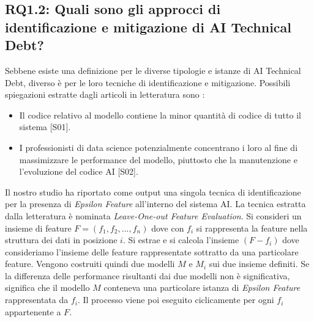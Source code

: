 \subsection{RQ1.2: Quali sono gli approcci di identificazione e mitigazione di AI Technical Debt?}

Sebbene esiste una definizione per le diverse tipologie e istanze di AI Technical Debt, diverso è per le loro tecniche di identificazione e mitigazione.
Possibili spiegazioni estratte dagli articoli in letteratura sono : 
\begin{itemize}
    \item Il codice relativo al modello contiene la minor quantità di codice di tutto il sistema [S01].
    \item I professionisti di data science potenzialmente concentrano i loro al fine di massimizzare le performance del modello, piuttosto che la manutenzione e l'evoluzione del codice AI [S02].
\end{itemize}
Il nostro studio ha riportato come output una singola tecnica di identificazione per la presenza di \textit{Epsilon Feature} all'interno del sistema AI.
La tecnica estratta dalla letteratura è nominata \textit{Leave-One-out Feature Evaluation}.
Si consideri un insieme di feature $F=(f_1,f_2,...,f_n)$ dove con $f_i$ si rappresenta la feature nella struttura dei dati in posizione $i$.
Si estrae e si calcola l'insieme $(F-f_i)$ dove consideriamo l'insieme delle feature rappresentate sottratto da una particolare feature.
Vengono costruiti quindi due modelli $M$ e $M_i$ sui due insieme definiti.
Se la differenza delle performance risultanti dai due modelli non è significativa, significa che il modello $M$ conteneva una particolare istanza di \textit{Epsilon Feature} rappresentata da $f_i$.
Il processo viene poi eseguito ciclicamente per ogni $f_i$ appartenente a $F$.\\



